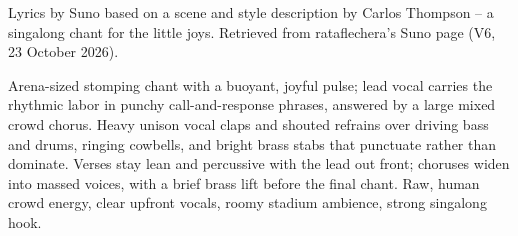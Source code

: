
\begin{notes}
Lyrics by Suno based on a scene and style description by Carlos Thompson -- a singalong chant for the little joys. Retrieved from rataflechera's Suno page (V6, 23 October 2026).
\end{notes}
\begin{style}
Arena-sized stomping chant with a buoyant, joyful pulse; lead vocal carries the rhythmic labor in punchy call-and-response phrases, answered by a large mixed crowd chorus. Heavy unison vocal claps and shouted refrains over driving bass and drums, ringing cowbells, and bright brass stabs that punctuate rather than dominate. Verses stay lean and percussive with the lead out front; choruses widen into massed voices, with a brief brass lift before the final chant. Raw, human crowd energy, clear upfront vocals, roomy stadium ambience, strong singalong hook.
\end{style}
